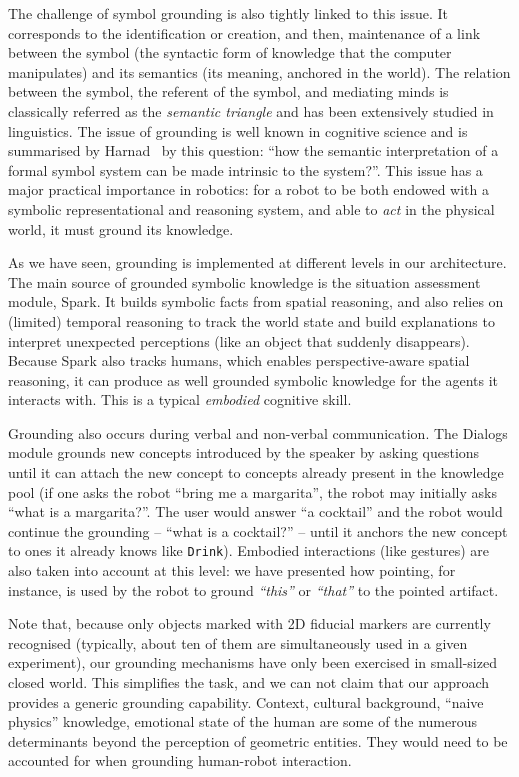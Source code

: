 \documentclass[preprint,3p,times]{elsarticle}
\newcommand{\concept}[1]{{\small \texttt{#1}}}
\begin{document}
The challenge of symbol grounding is also tightly linked to this issue. It
corresponds to the identification or creation, and then, maintenance of a link
between the symbol (the syntactic form of knowledge that the computer
manipulates) and its semantics (its meaning, anchored in the world). The
relation between the symbol, the referent of the symbol, and mediating minds
is classically referred as the \emph{semantic triangle} and has been
extensively studied in linguistics. The issue of grounding is well known in
cognitive science and is summarised by Harnad~\cite{Harnad1990} by this
question: ``how the semantic interpretation of a formal symbol system can be
made intrinsic to the system?''. This issue has a major practical importance in
robotics: for a robot to be both endowed with a symbolic representational and
reasoning system, and able to \emph{act} in the physical world, it must ground
its knowledge.

As we have seen, grounding is implemented at different levels in our
architecture. The main source of grounded symbolic knowledge is the situation
assessment module, {\sc Spark}. It builds symbolic facts from spatial reasoning,
and also relies on (limited) temporal reasoning to track the world state and
build explanations to interpret unexpected perceptions (like an object that
suddenly disappears). Because {\sc Spark} also tracks humans, which enables
perspective-aware spatial reasoning, it can produce as well grounded symbolic
knowledge for the agents it interacts with. This is a typical \emph{embodied}
cognitive skill.

Grounding also occurs during verbal and non-verbal communication. The {\sc
Dialogs} module grounds new concepts introduced by the speaker by asking
questions until it can attach the new concept to concepts already present in the
knowledge pool (if one asks the robot ``bring me a margarita'', the robot may
initially asks ``what is a margarita?''. The user would answer ``a cocktail''
and the robot would continue the grounding -- ``what is a cocktail?'' -- until
it anchors the new concept to ones it already knows like \concept{Drink}). Embodied interactions
(like gestures) are also taken into account at this level: we have presented how
pointing, for instance, is used by the robot to ground \emph{``this''} or
\emph{``that''} to the pointed artifact.

Note that, because only objects marked with 2D fiducial markers are currently
recognised (typically, about ten of them are simultaneously used in a given
experiment), our grounding mechanisms have only been exercised in small-sized
closed world. This simplifies the task, and we can not claim that our approach
provides a generic grounding capability. Context, cultural background, ``naive physics'' knowledge, emotional
state of the human are some of the numerous determinants beyond the perception of geometric
entities. They would need to be accounted for when grounding human-robot interaction.
\end{document}
